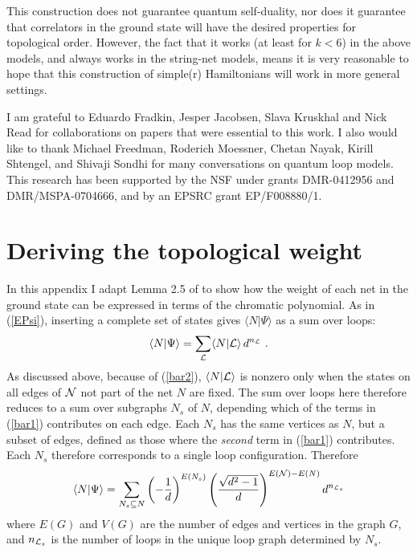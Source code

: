 \documentclass[11pt]{article}
\begin{document}
This construction does not guarantee quantum self-duality,
nor does it guarantee that correlators in the ground state will have
the desired properties for topological order. However, the fact that
it works (at least for $k<6$) in the above models, and always works in
the string-net models, means it is very reasonable to hope that this
construction of simple(r) Hamiltonians will work in more general
settings.







\bigskip

I am grateful to Eduardo Fradkin, Jesper Jacobsen, Slava Kruskhal and
Nick Read for collaborations on papers that were essential to this
work.  I also would like to thank Michael Freedman, Roderich Moessner,
Chetan Nayak, Kirill Shtengel, and Shivaji Sondhi for many
conversations on quantum loop models. This research has been supported
by the NSF under grants DMR-0412956 and DMR/MSPA-0704666, and by an
EPSRC grant EP/F008880/1.


\appendix
\section{Deriving the topological weight}

In this appendix I adapt Lemma 2.5 of \cite{FKrush} to show how the
weight of each net in the ground state can be expressed in terms of
the chromatic polynomial. As in (\ref{EPsi}), inserting a complete set
of states gives $\langle N|\Psi\rangle$ as a sum over loops:
\begin{equation}
\langle N|\Psi\rangle =
\sum_{\cal L} \langle N|{\cal L} \rangle\, d^{n_{\cal L}} \ .
\label{NPsi}
\end{equation}
As discussed above, because of (\ref{bar2}), $\langle N|{\cal L} \rangle$
is nonzero only when the states on
all edges of ${\cal N}$ not part of the net $N$ are fixed. The sum over loops here
therefore reduces
to a sum over subgraphs $N_s$ of $N$, depending which of the terms in
(\ref{bar1}) contributes on each edge. Each $N_s$ has the same
vertices as $N$, but a subset of edges, defined as those
where the {\em second} term in (\ref{bar1}) contributes.
Each $N_s$ therefore corresponds to a single loop configuration.
Therefore
\begin{equation}
\langle N | \Psi\rangle = \sum_{N_s\subseteq N}
\left(-\frac{1}{d}\right)^{E(N_s)}
\left(\frac{\sqrt{d^2-1}}{d}\right)^{E({\cal N})-E(N)} d^{n_{{\cal L}_s}}
\label{NPsinL}
\end{equation}
 where $E(G)$ and $V(G)$ are the number of edges and vertices in
the graph $G$, and $n_{{\cal L}_s}$ is the number of loops in the unique
loop graph determined by $N_s$. 
\end{document}
